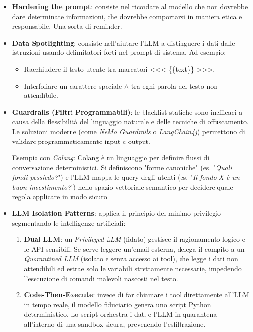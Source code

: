 \begin{itemize}
    \item \textbf{Hardening the prompt}: consiste nel ricordare al modello 
    che non dovrebbe dare determinate informazioni, che dovrebbe comportarsi 
    in maniera etica e responsabile. Una sorta di reminder.
    \item \textbf{Data Spotlighting}: consiste nell'aiutare l'LLM a distinguere i dati 
    dalle istruzioni usando delimitatori forti nel prompt di sistema. Ad esempio:
    \begin{itemize}
        \item Racchiudere il testo utente tra marcatori <<< \{\{text\}\} >>>.
        \item Interfoliare un carattere speciale $\wedge$ tra ogni parola del testo non attendibile.
    \end{itemize}
    \item \textbf{Guardrails (Filtri Programmabili)}: le blacklist statiche 
    sono inefficaci a causa della flessibilità del linguaggio naturale e 
    delle tecniche di offuscamento. Le soluzioni moderne (come \textit{NeMo Guardrails} o \textit{LangChain4j}) 
    permettono di validare programmaticamente input e output.

    Esempio con \textit{Colang}: Colang è un linguaggio per definire flussi 
    di conversazione deterministici. Si definiscono "forme canoniche" 
    (es. "\textit{Quali fondi possiedo?}") e l'LLM mappa le query degli 
    utenti (es. "\textit{Il fondo X è un buon investimento?}") nello 
    spazio vettoriale semantico per decidere quale regola applicare in 
    modo sicuro.
    \item \textbf{LLM Isolation Patterns}: applica il principio del minimo 
    privilegio segmentando le intelligenze artificiali:
    \begin{enumerate}
        \item \textbf{Dual LLM}: un \textit{Privileged LLM} (fidato) gestisce il 
        ragionamento logico e le API sensibili. Se serve leggere un'email 
        esterna, delega il compito a un \textit{Quarantined LLM} (isolato e senza 
        accesso ai tool), che legge i dati non attendibili ed estrae solo 
        le variabili strettamente necessarie, impedendo l'esecuzione di 
        comandi malevoli nascosti nel testo.
        \item \textbf{Code-Then-Execute}: invece di far chiamare i tool 
        direttamente all'LLM in tempo reale, il modello fiduciario genera 
        uno script Python deterministico. Lo script orchestra i dati e 
        l'LLM in quarantena all'interno di una sandbox sicura, prevenendo 
        l'esfiltrazione.
    \end{enumerate}
\end{itemize}


